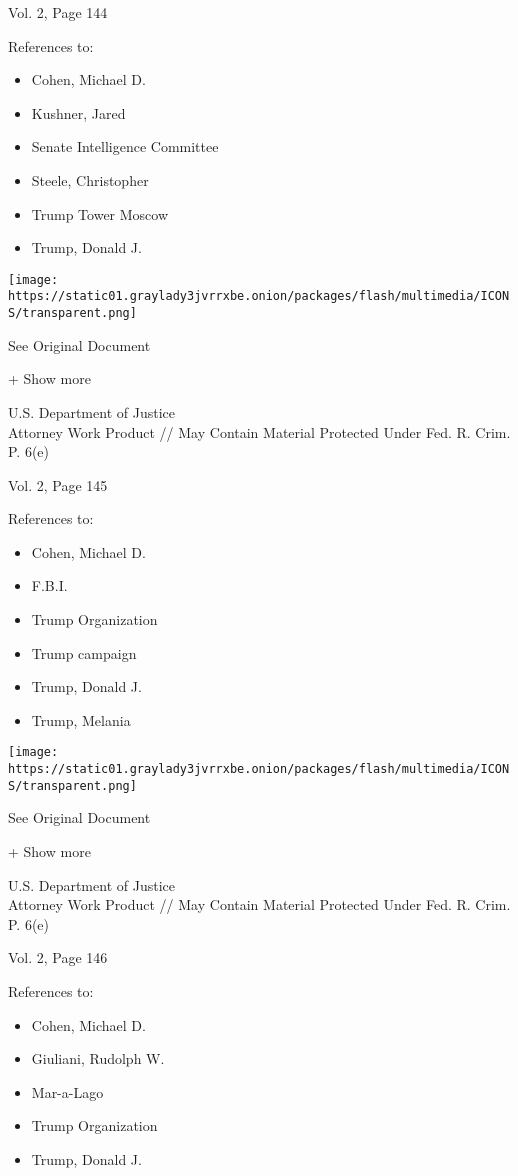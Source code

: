 Vol. 2, Page 144

References to:

\begin{itemize}
\tightlist
\item
  Cohen, Michael D.
\item
  Kushner, Jared
\item
  Senate Intelligence Committee
\item
  Steele, Christopher
\item
  Trump Tower Moscow
\item
  Trump, Donald J.
\end{itemize}

\protect\hyperlink{}{}

\texttt{[image: https://static01.graylady3jvrrxbe.onion/packages/flash/multimedia/ICONS/transparent.png]}

See Original Document

+ Show more

U.S. Department of Justice\\
Attorney Work Product // May Contain Material Protected Under Fed. R.
Crim. P. 6(e)

Vol. 2, Page 145

References to:

\begin{itemize}
\tightlist
\item
  Cohen, Michael D.
\item
  F.B.I.
\item
  Trump Organization
\item
  Trump campaign
\item
  Trump, Donald J.
\item
  Trump, Melania
\end{itemize}

\protect\hyperlink{}{}

\texttt{[image: https://static01.graylady3jvrrxbe.onion/packages/flash/multimedia/ICONS/transparent.png]}

See Original Document

+ Show more

U.S. Department of Justice\\
Attorney Work Product // May Contain Material Protected Under Fed. R.
Crim. P. 6(e)

Vol. 2, Page 146

References to:

\begin{itemize}
\tightlist
\item
  Cohen, Michael D.
\item
  Giuliani, Rudolph W.
\item
  Mar-a-Lago
\item
  Trump Organization
\item
  Trump, Donald J.
\end{itemize}

